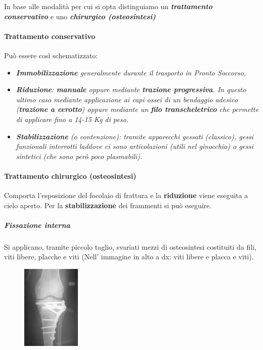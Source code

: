 In base alle modalità per cui si opta distinguiamo un \textbf{\emph{trattamento conservativo}} e uno \textbf{\emph{chirurgico (osteosintesi)}}


\paragraph{Trattamento conservativo}

Può essere così schematizzato:

\begin{itemize}
\item
  \emph{\textbf{Immobilizzazione} generalmente durante il trasporto in Pronto Soccorso, }
\item
  \emph{\textbf{Riduzione}: \textbf{manuale} oppure mediante \textbf{trazione progressiva}. In questo ultimo caso mediante applicazione ai capi ossei di un bendaggio adesivo (\textbf{trazione a cerotto}) oppure mediante un \textbf{filo transcheletrico} che permette di applicare fino a 14-15 Kg di peso.}
\item
  \emph{\textbf{Stabilizzazione} (o contenzione): tramite apparecchi gessati (classico), gessi funzionali interrotti laddove ci sono articolazioni (utili nel ginocchio) o gessi sintetici (che sono però poco plasmabili).}
\end{itemize}


\paragraph{Trattamento chirurgico (osteosintesi)}

Comporta l'esposizione del focolaio di frattura e la \textbf{riduzione} viene eseguita a cielo aperto.
Per la \textbf{stabilizzazione} dei frammenti si può eseguire.

\subparagraph{Fissazione interna}
Si applicano, tramite piccolo taglio, svariati mezzi di osteosintesi costituiti da fili, viti libere, placche e viti (Nell' immagine in alto a dx: viti libere e placca e viti).
  
\begin{figure}[!ht]
\centering
\includegraphics[width=0.25\textwidth]{001/image3.jpeg}
\end{figure}

